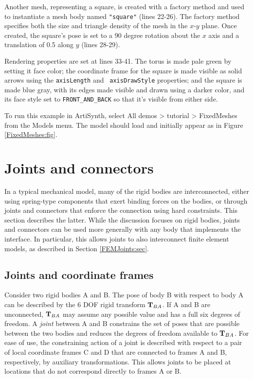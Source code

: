Another mesh, representing a square, is created with a factory method
and used to instantiate a mesh body named {\tt "square"} (lines
22-26). The factory method specifies both the size and triangle
density of the mesh in the $x$-$y$ plane. Once created, the square's
pose is set to a 90 degree rotation about the $x$ axis and a
translation of 0.5 along $y$ (lines 28-29).

Rendering properties are set at lines 33-41. The torus is made pale
green by setting it face color; the coordinate frame for the square is
made visible as solid arrows using the {\tt axisLength} and {\tt
axisDrawStyle} properties; and the square is made blue gray, with its
edges made visible and drawn using a darker color, and its face style
set to {\tt FRONT\_AND\_BACK} so that it's visible from either side.

To run this example in ArtiSynth, select {\sf All demos > tutorial >
FixedMeshes} from the {\sf Models} menu. The model should load and
initially appear as in Figure \ref{FixedMeshes:fig}.

\section{Joints and connectors}
\label{JointsAndConnectors:sec}

In a typical mechanical model, many of the rigid bodies are
interconnected, either using spring-type components that exert binding
forces on the bodies, or through joints and connectors that enforce
the connection using hard constraints. This section describes the
latter. While the discussion focuses on rigid bodies, joints and
connectors can be used more generally with any body that implements
the 
interface. In particular, this allows joints to also interconnect
finite element models, as described in Section \ref{FEMJoints:sec}.

\subsection{Joints and coordinate frames}
\label{JointsAndFrames:sec}

Consider two rigid bodies A and B. The pose of body B with respect to
body A can be described by the 6 DOF rigid transform ${\bf T}_{BA}$.  If A
and B are unconnected, ${\bf T}_{BA}$ may assume any possible value and has
a full six degrees of freedom. A {\it joint} between A and B
constrains the set of poses that are possible between the two bodies
and reduces the degrees of freedom available to ${\bf T}_{BA}$.  For ease
of use, the constraining action of a joint is described with respect
to a pair of local coordinate frames C and D that are connected to
frames A and B, respectively, by auxiliary transformations.  This
allows joints to be placed at locations that do not correspond
directly to frames A or B.

